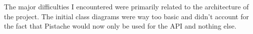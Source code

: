 The major difficulties I encountered were primarily related to the architecture of the project. The initial class diagrams were way too basic and didn't account for the fact that Pistache would now only be used for the API and nothing else. 

